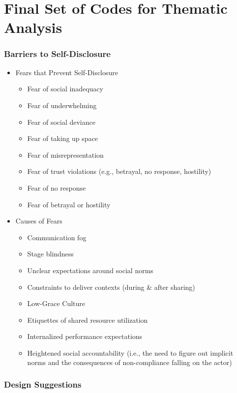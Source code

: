 \section{Final Set of Codes for Thematic Analysis}
\label{ref:codes}

\subsubsection*{Barriers to Self-Disclosure}

\begin{itemize}
    \item Fears that Prevent Self-Disclosure
    \begin{itemize}
        \item Fear of social inadequacy
        \item Fear of underwhelming
        \item Fear of social deviance
        \item Fear of taking up space
        \item Fear of misrepresentation
        \item Fear of trust violations (e.g., betrayal, no response, hostility)
        \item Fear of no response
        \item Fear of betrayal or hostility
    \end{itemize}
    \item Causes of Fears
    \begin{itemize}
        \item Communication fog
        \item Stage blindness
        \item Unclear expectations around social norms
        \item Constraints to deliver contexts (during \& after sharing)
        \item Low-Grace Culture
        \item Etiquettes of shared resource utilization
        \item Internalized performance expectations
        \item Heightened social accountability (i.e., the need to figure out implicit norms and the consequences of non-compliance falling on the actor)
    \end{itemize}
\end{itemize}


\subsubsection*{Design Suggestions}


